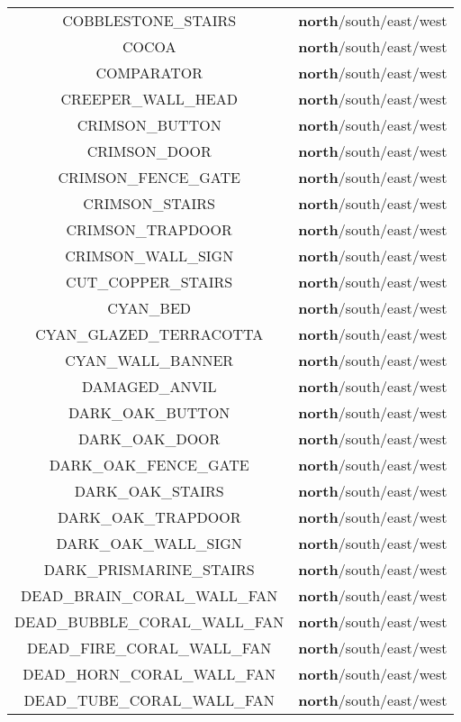 \begin{longtable}{ |c|c| }
	COBBLESTONE\_STAIRS & \textbf{north}/south/east/west \\
	COCOA & \textbf{north}/south/east/west \\
	COMPARATOR & \textbf{north}/south/east/west \\
	CREEPER\_WALL\_HEAD & \textbf{north}/south/east/west \\
	CRIMSON\_BUTTON & \textbf{north}/south/east/west \\
	CRIMSON\_DOOR & \textbf{north}/south/east/west \\
	CRIMSON\_FENCE\_GATE & \textbf{north}/south/east/west \\
	CRIMSON\_STAIRS & \textbf{north}/south/east/west \\
	CRIMSON\_TRAPDOOR & \textbf{north}/south/east/west \\
	CRIMSON\_WALL\_SIGN & \textbf{north}/south/east/west \\
	CUT\_COPPER\_STAIRS & \textbf{north}/south/east/west \\
	CYAN\_BED & \textbf{north}/south/east/west \\
	CYAN\_GLAZED\_TERRACOTTA & \textbf{north}/south/east/west \\
	CYAN\_WALL\_BANNER & \textbf{north}/south/east/west \\
	DAMAGED\_ANVIL & \textbf{north}/south/east/west \\
	DARK\_OAK\_BUTTON & \textbf{north}/south/east/west \\
	DARK\_OAK\_DOOR & \textbf{north}/south/east/west \\
	DARK\_OAK\_FENCE\_GATE & \textbf{north}/south/east/west \\
	DARK\_OAK\_STAIRS & \textbf{north}/south/east/west \\
	DARK\_OAK\_TRAPDOOR & \textbf{north}/south/east/west \\
	DARK\_OAK\_WALL\_SIGN & \textbf{north}/south/east/west \\
	DARK\_PRISMARINE\_STAIRS & \textbf{north}/south/east/west \\
	DEAD\_BRAIN\_CORAL\_WALL\_FAN & \textbf{north}/south/east/west \\
	DEAD\_BUBBLE\_CORAL\_WALL\_FAN & \textbf{north}/south/east/west \\
	DEAD\_FIRE\_CORAL\_WALL\_FAN & \textbf{north}/south/east/west \\
	DEAD\_HORN\_CORAL\_WALL\_FAN & \textbf{north}/south/east/west \\
	DEAD\_TUBE\_CORAL\_WALL\_FAN & \textbf{north}/south/east/west \\

\end{longtable}
